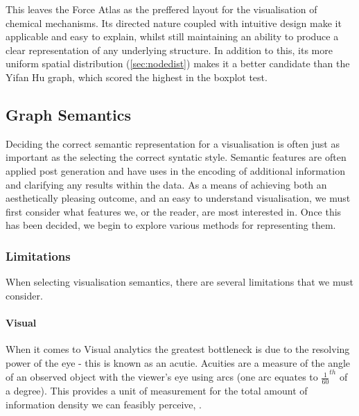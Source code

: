 This leaves the Force Atlas as the preffered layout for the visualisation of chemical mechanisms. Its directed nature coupled with intuitive design make it applicable and easy to explain, whilst still maintaining an ability to produce a clear representation of any underlying structure. In addition to this, its more uniform spatial distribution (\autoref{sec:nodedist}) makes it a better candidate than the Yifan Hu graph, which scored the highest in the boxplot test. 













\subsection{Graph Semantics}\label{semantic}

Deciding the correct semantic representation for a visualisation is often just as important as the selecting the correct syntatic style. Semantic features are often applied post generation \cite{aestheticsgraphvis} and have uses in the encoding of additional information and clarifying any results within the data. As a means of achieving both an aesthetically pleasing outcome, and an easy to understand visualisation, we must first consider what features we, or the reader, are most interested in. Once this has been decided, we begin to explore various methods for representing them. 

\subsubsection{Limitations}

When selecting visualisation semantics, there are several limitations that we must consider. 

\paragraph*{Visual}
When it comes to Visual analytics the greatest bottleneck is due to the resolving power of the eye - this is known as an acutie. Acuities are a measure of the angle of an observed object with the viewer's eye using arcs (one arc equates to $\frac{1}{60}^{th}$ of a degree). This provides a unit of measurement for the total amount of information density we can feasibly perceive, \cite{ware}. 

